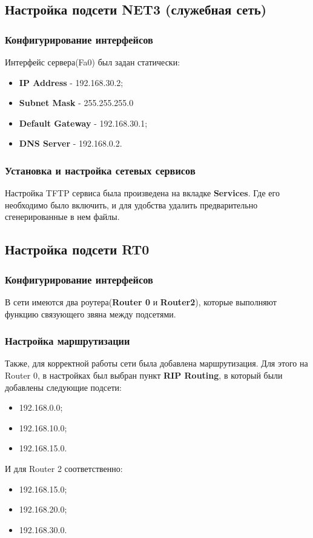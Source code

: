\documentclass[14pt,a4paper,report]{report}
\begin{document}
\subsection{Настройка подсети NET3 (служебная сеть)}
\subsubsection{Конфигурирование интерфейсов}
Интерфейс сервера(Fa0) был задан статически:
\begin{itemize}
\item \textbf{IP Address} - 192.168.30.2;
\item \textbf{Subnet Mask} - 255.255.255.0
\item \textbf{Default Gateway} - 192.168.30.1;
\item \textbf{DNS Server} - 192.168.0.2.
\end{itemize}
\subsubsection{Установка и настройка сетевых сервисов}
Настройка TFTP сервиса была произведена на вкладке \textbf{Services}. Где его необходимо было включить, и для удобства удалить предварительно сгенерированные в нем файлы.

\subsection{Настройка подсети RT0}
\subsubsection{Конфигурирование интерфейсов}
В сети имеются два роутера(\textbf{Router 0} и \textbf{Router2}), которые выполняют функцию связующего звяна между подсетями.

\subsubsection{Настройка маршрутизации}
Также, для корректной работы сети была добавлена маршрутизация. Для этого на Router 0, в настройках был выбран пункт \textbf{RIP Routing}, в который были добавлены следующие подсети:
\begin{itemize}
\item 192.168.0.0;
\item 192.168.10.0;
\item 192.168.15.0.
\end{itemize}
И для Router 2 соответственно:
\begin{itemize}
\item 192.168.15.0;
\item 192.168.20.0;
\item 192.168.30.0.
\end{itemize}
\end{document}
